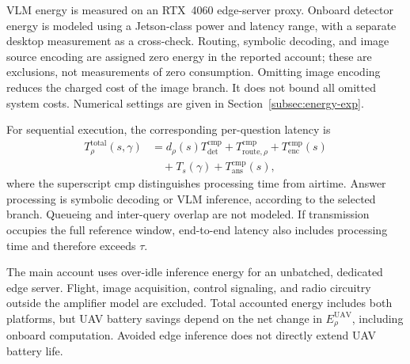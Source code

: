 VLM energy is measured on an RTX~4060 edge-server proxy. Onboard
detector energy is modeled using a Jetson-class power and latency
range, with a separate desktop measurement as a cross-check.
Routing, symbolic decoding, and image source encoding are assigned
zero energy in the reported account; these are exclusions, not
measurements of zero consumption. Omitting image encoding reduces
the charged cost of the image branch. It does not bound all omitted
system costs. Numerical settings are given in
Section~\ref{subsec:energy-exp}.

For sequential execution, the corresponding per-question latency is
\begin{equation}\label{eq:latency}
\begin{aligned}
T_\rho^{\mathrm{total}}(s,\gamma)
 &=d_\rho(s)T_{\mathrm{det}}^{\mathrm{cmp}}
   +T_{\mathrm{route},\rho}^{\mathrm{cmp}}
   +T_{\mathrm{enc}}^{\mathrm{cmp}}(s)\\
 &\quad+T_s(\gamma)+T_{\mathrm{ans}}^{\mathrm{cmp}}(s),
\end{aligned}
\end{equation}
where the superscript $\mathrm{cmp}$ distinguishes processing time
from airtime. Answer processing is symbolic decoding or VLM
inference, according to the selected branch. Queueing and inter-query
overlap are not modeled. If transmission occupies the full reference
window, end-to-end latency also includes processing time and therefore
exceeds $\tau$.

The main account uses over-idle inference energy for an unbatched,
dedicated edge server.
Flight, image acquisition, control signaling, and radio circuitry
outside the amplifier model are excluded. Total accounted energy
includes both platforms, but UAV battery savings depend on the net
change in $E_\rho^{\mathrm{UAV}}$, including onboard computation.
Avoided edge inference does not directly extend UAV battery life.
